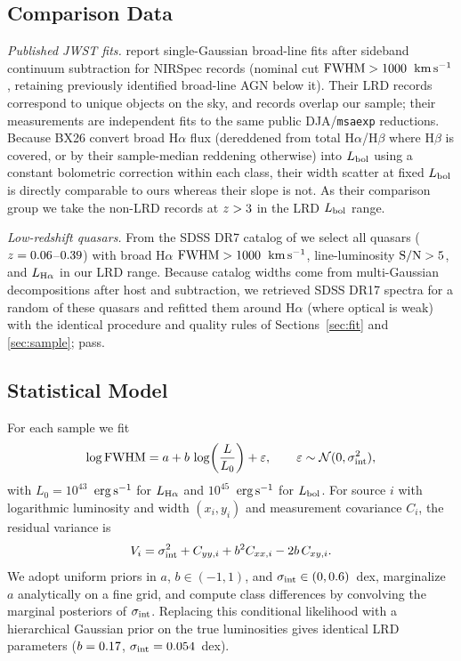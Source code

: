 \documentclass[twocolumn,linenumbers]{aastex701}
\newcommand{\Ha}{H$\alpha$}
\newcommand{\Hb}{H$\beta$}
\newcommand{\kms}{\ensuremath{{\rm km\,s^{-1}}}}
\newcommand{\ergs}{\ensuremath{{\rm erg\,s^{-1}}}}
\newcommand{\sigint}{\sigma_{\rm int}}
\newcommand{\LHa}{L_{\rm H\alpha}}
\newcommand{\Lbol}{L_{\rm bol}}
\newcommand{\BX}{BX26}
\begin{document}


\subsection{Comparison Data} \label{sec:bx}

\emph{Published JWST fits.}
\citet[][hereafter \BX{}]{BaccusXu2026} report single-Gaussian broad-line fits after sideband continuum subtraction for \NX{} NIRSpec records (nominal cut ${\rm FWHM}>1000{}$~\kms{}, retaining previously identified broad-line AGN below it).
Their \NXLRD{} LRD records correspond to \NXLRDuniq{} unique objects on the sky, and \NXOvRec{} records overlap our sample; their measurements are independent fits to the same public DJA/\texttt{msaexp} reductions.
Because \BX{} convert broad \Ha{} flux (dereddened from total \Ha/\Hb{} where \Hb{} is covered, or by their sample-median reddening otherwise) into $\Lbol$ using a constant bolometric correction within each class, their width scatter at fixed $\Lbol$ is directly comparable to ours whereas their slope is not.
As their comparison group we take the \NXCtrl{} non-LRD records at $z>3{}$ in the LRD $\Lbol$ range.

\emph{Low-redshift quasars.}
From the SDSS DR7 catalog of \citet{Shen2011} we select all \NSDSS{} quasars ($z=0.06{}$--$0.39{}$) with broad \Ha{} ${\rm FWHM}>1000{}$~\kms{}, line-luminosity ${\rm S/N}>5{}$, and $\LHa$ in our LRD range.
Because catalog widths come from multi-Gaussian decompositions after host and  subtraction, we retrieved SDSS DR17 spectra for a random \NSsgDraw{} of these quasars and refitted them around \Ha{} (where optical  is weak) with the identical procedure and quality rules of Sections~\ref{sec:fit} and \ref{sec:sample}; \NSsg{} pass.

\subsection{Statistical Model} \label{sec:model}

For each sample we fit
\begin{equation} \label{eq:model}
\log {\rm FWHM} = a + b\,\log\!\left(\frac{L}{L_0}\right) + \varepsilon, \qquad \varepsilon\sim\mathcal{N}(0,\sigint^2),
\end{equation}
with $L_0=10^{43}$~\ergs{} for $\LHa$ and $10^{45}$~\ergs{} for $\Lbol$.
For source $i$ with logarithmic luminosity and width $(x_i,y_i)$ and measurement covariance $C_i$, the residual variance is
\begin{equation} \label{eq:var}
V_i=\sigint^2 + C_{yy,i} + b^2 C_{xx,i} - 2b\,C_{xy,i} .
\end{equation}
We adopt uniform priors in $a$, $b\in(-1,1)$, and $\sigint\in(0,0.6)$~dex, marginalize $a$ analytically on a fine grid, and compute class differences by convolving the marginal posteriors of $\sigint$.
Replacing this conditional likelihood with a hierarchical Gaussian prior on the true luminosities gives identical LRD parameters ($b=0.17{}$, $\sigint=\hierSig{}$~dex).
\end{document}
